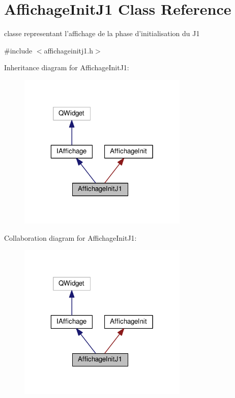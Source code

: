 \hypertarget{classAffichageInitJ1}{\section{Affichage\+Init\+J1 Class Reference}
\label{classAffichageInitJ1}
}


classe representant l'affichage de la phase d'initialisation du J1  




{\ttfamily \#include $<$affichageinitj1.\+h$>$}



Inheritance diagram for Affichage\+Init\+J1\+:
\nopagebreak
\begin{figure}[H]
\begin{center}
\leavevmode
\includegraphics[width=229pt]{classAffichageInitJ1__inherit__graph}
\end{center}
\end{figure}


Collaboration diagram for Affichage\+Init\+J1\+:
\nopagebreak
\begin{figure}[H]
\begin{center}
\leavevmode
\includegraphics[width=229pt]{classAffichageInitJ1__coll__graph}
\end{center}
\end{figure}
